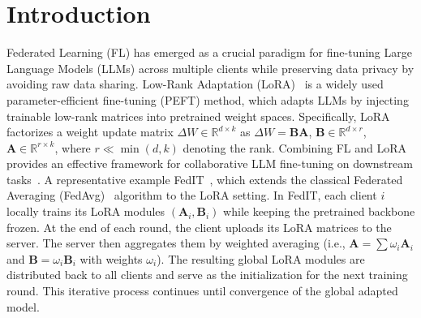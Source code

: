 \documentclass{article} %
\begin{document}

\section{Introduction}

Federated Learning (FL) has emerged as a crucial paradigm for fine-tuning Large Language Models (LLMs) across multiple clients while preserving data privacy by avoiding raw data sharing. Low-Rank Adaptation (LoRA)~\cite{hu2021lora} is a widely used parameter-efficient fine-tuning (PEFT) method, which adapts LLMs by injecting trainable low-rank matrices into pretrained weight spaces. Specifically, LoRA factorizes a weight update matrix $\Delta W \in \mathbb{R}^{d\times k}$ as $\Delta W = \mathbf{B}\mathbf{A}$, $\mathbf{B}\in \mathbb{R}^{d\times r}$, $\mathbf{A}\in \mathbb{R}^{r\times k}$, where $r \ll \min(d,k)$ denoting the rank. Combining FL and LoRA provides an effective framework for collaborative LLM fine-tuning on downstream tasks~\cite{wang2018glue}. 
A representative example FedIT~\cite{zhang2023towards}, which extends the classical Federated Averaging (FedAvg)~\cite{mcmahan2017communication} algorithm to the LoRA setting. In FedIT, each client $i$ locally trains its LoRA modules $(\mathbf{A}_i,\mathbf{B}_i)$ while keeping the pretrained backbone frozen. At the end of each round, the client uploads its LoRA matrices to the server. The server then aggregates them by weighted averaging (i.e., $\mathbf{A} = \sum \omega_i \mathbf{A}_i$ and $\mathbf{B}=\omega_i \mathbf{B}_i$ with weights $\omega_i$). The resulting global LoRA modules are distributed back to all clients and serve as the initialization for the next training round. This iterative process continues until convergence of the global adapted model. 
\end{document}
